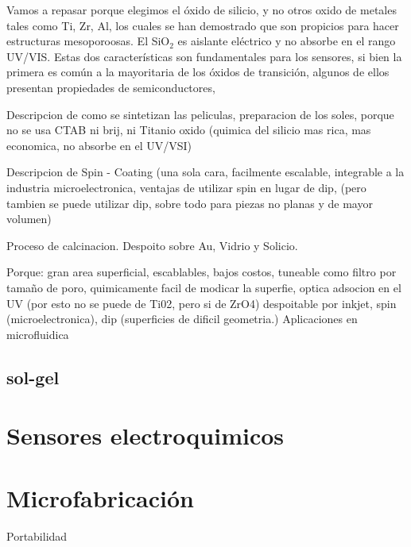 				Vamos a repasar porque elegimos el óxido de silicio, y no otros oxido de metales tales como Ti, Zr, Al, los cuales se han demostrado que son propicios para hacer estructuras mesoporoosas. El SiO$_2$ es aislante eléctrico y no absorbe en el rango UV/VIS. Estas dos características son fundamentales para los sensores, si bien la primera es común a la mayoritaria de los óxidos de transición, algunos de ellos presentan propiedades de semiconductores, 

				Descripcion de como se sintetizan las peliculas, preparacion de los soles, porque no se usa CTAB ni brij, ni Titanio oxido (quimica del silicio mas rica, mas economica, no absorbe en el UV/VSI)

				Descripcion de Spin - Coating (una sola cara, facilmente escalable, integrable a la industria microelectronica, ventajas de utilizar spin en lugar de dip, (pero tambien se puede utilizar dip, sobre todo para piezas no planas y de mayor volumen)

				Proceso de calcinacion. Despoito sobre Au, Vidrio y Solicio.

				Porque: gran area superficial, escablables, bajos costos, tuneable como filtro por tamaño de poro, quimicamente facil de modicar la superfie, optica adsocion en el UV (por esto no se puede de Ti02, pero si de ZrO4) despoitable por inkjet\cite{Lian2013,Mougenot2006a}, spin (microelectronica), dip (superficies de dificil geometria.)
				Aplicaciones en microfluidica \cite{schmuhl2005,Martinez2009}
				
	\subsection{sol-gel}	

\section{Sensores electroquimicos}

\section{Microfabricación}


Portabilidad

